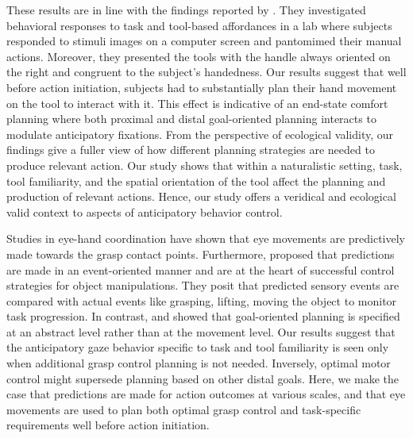 These results are in line with the findings reported by \citet{Belardinelli2016-xb}. They investigated behavioral responses to task and tool-based affordances in a lab where subjects responded to stimuli images on a computer screen and pantomimed their manual actions. Moreover, they presented the tools with the handle always oriented on the right and congruent to the subject’s handedness. Our results suggest that well before action initiation, subjects had to substantially plan their hand movement on the tool to interact with it. This effect is indicative of an end-state comfort planning \citep{Herbort2012-ma} where both proximal and distal goal-oriented planning interacts to modulate anticipatory fixations. From the perspective of ecological validity, our findings give a fuller view of how different planning strategies are needed to produce relevant action. Our study shows that within a naturalistic setting, task, tool familiarity, and the spatial orientation of the tool affect the planning and production of relevant actions. Hence, our study offers a veridical and ecological valid context to aspects of anticipatory behavior control.

Studies in eye-hand coordination \citep{Johansson2001-sa, Lohmann2019-fy, Belardinelli2018-xm} have shown that eye movements are predictively made towards the grasp contact points. Furthermore, \citet{Flanagan2006-ql} proposed that predictions are made in an event-oriented manner and are at the heart of successful control strategies for object manipulations. They posit that predicted sensory events are compared with actual events like grasping, lifting, moving the object to monitor task progression. In contrast, \citet{Iacoboni2005-kw} and \citet{Wohlschlager2003-qe} showed that goal-oriented planning is specified at an abstract level rather than at the movement level. Our results suggest that the anticipatory gaze behavior specific to task and tool familiarity is seen only when additional grasp control planning is not needed. Inversely, optimal motor control might supersede planning based on other distal goals. Here, we make the case that predictions are made for action outcomes at various scales, and that eye movements are used to plan both optimal grasp control and task-specific requirements well before action initiation. 


